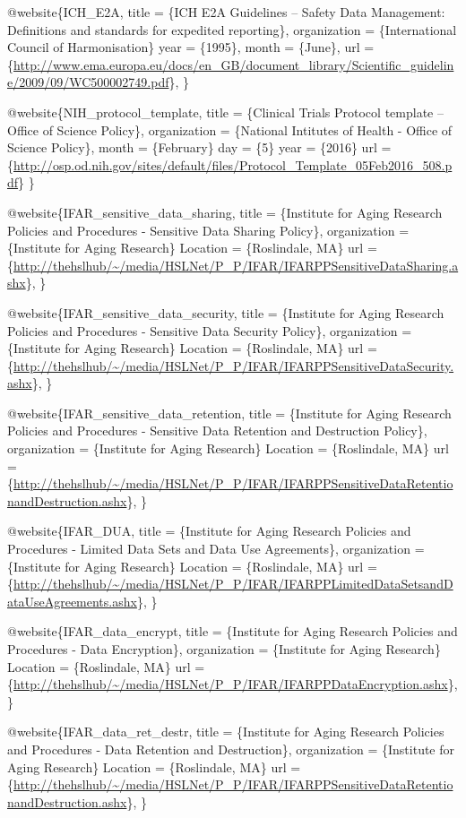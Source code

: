 \documentclass[]{book}
\theoremstyle{definition}
\theoremstyle{definition}
\theoremstyle{definition}
\theoremstyle{remark}
\begin{document}
@website\{ICH\_E2A, title = \{ICH E2A Guidelines -- Safety Data
Management: Definitions and standards for expedited reporting\},
organization = \{International Council of Harmonisation\} year =
\{1995\}, month = \{June\}, url =
\{\url{http://www.ema.europa.eu/docs/en_GB/document_library/Scientific_guideline/2009/09/WC500002749.pdf}\},
\}

@website\{NIH\_protocol\_template, title = \{Clinical Trials Protocol
template -- Office of Science Policy\}, organization = \{National
Intitutes of Health - Office of Science Policy\}, month = \{February\}
day = \{5\} year = \{2016\} url =
\{\url{http://osp.od.nih.gov/sites/default/files/Protocol_Template_05Feb2016_508.pdf}\}
\}

@website\{IFAR\_sensitive\_data\_sharing, title = \{Institute for Aging
Research Policies and Procedures - Sensitive Data Sharing Policy\},
organization = \{Institute for Aging Research\} Location = \{Roslindale,
MA\} url =
\{\url{http://thehslhub/~/media/HSLNet/P_P/IFAR/IFARPPSensitiveDataSharing.ashx}\},
\}

@website\{IFAR\_sensitive\_data\_security, title = \{Institute for Aging
Research Policies and Procedures - Sensitive Data Security Policy\},
organization = \{Institute for Aging Research\} Location = \{Roslindale,
MA\} url =
\{\url{http://thehslhub/~/media/HSLNet/P_P/IFAR/IFARPPSensitiveDataSecurity.ashx}\},
\}

@website\{IFAR\_sensitive\_data\_retention, title = \{Institute for
Aging Research Policies and Procedures - Sensitive Data Retention and
Destruction Policy\}, organization = \{Institute for Aging Research\}
Location = \{Roslindale, MA\} url =
\{\url{http://thehslhub/~/media/HSLNet/P_P/IFAR/IFARPPSensitiveDataRetentionandDestruction.ashx}\},
\}

@website\{IFAR\_DUA, title = \{Institute for Aging Research Policies and
Procedures - Limited Data Sets and Data Use Agreements\}, organization =
\{Institute for Aging Research\} Location = \{Roslindale, MA\} url =
\{\url{http://thehslhub/~/media/HSLNet/P_P/IFAR/IFARPPLimitedDataSetsandDataUseAgreements.ashx}\},
\}

@website\{IFAR\_data\_encrypt, title = \{Institute for Aging Research
Policies and Procedures - Data Encryption\}, organization = \{Institute
for Aging Research\} Location = \{Roslindale, MA\} url =
\{\url{http://thehslhub/~/media/HSLNet/P_P/IFAR/IFARPPDataEncryption.ashx}\},
\}

@website\{IFAR\_data\_ret\_destr, title = \{Institute for Aging Research
Policies and Procedures - Data Retention and Destruction\}, organization
= \{Institute for Aging Research\} Location = \{Roslindale, MA\} url =
\{\url{http://thehslhub/~/media/HSLNet/P_P/IFAR/IFARPPSensitiveDataRetentionandDestruction.ashx}\},
\}
\end{document}
